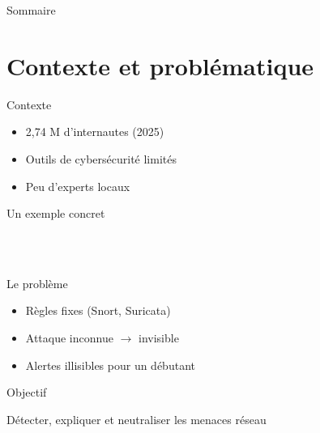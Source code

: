 \documentclass[11pt,aspectratio=169]{beamer}
\begin{document}
\begin{frame}{Sommaire}
  \tableofcontents
\end{frame}

\section{Contexte et problématique}

\begin{frame}{Contexte}
  \begin{itemize}[<+->]
    \item 2,74 M d'internautes (2025)
    \item Outils de cybersécurité limités
    \item Peu d'experts locaux
  \end{itemize}
\end{frame}

\begin{frame}{Un exemple concret}
  \begin{center}
    \\[6pt]
    \\[4pt]
  \end{center}
\end{frame}

\begin{frame}{Le problème}
  \begin{itemize}[<+->]
    \item Règles fixes (Snort, Suricata)
    \item Attaque inconnue $\rightarrow$ invisible
    \item Alertes illisibles pour un débutant
  \end{itemize}
\end{frame}

\begin{frame}{Objectif}
  \begin{center}
    \Large Détecter, expliquer et neutraliser les menaces réseau\\[6pt]
  \end{center}
\end{frame}

\end{document}
